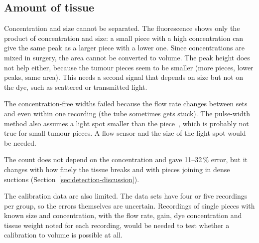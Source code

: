 \subsection{Amount of tissue}
\label{sec:amount-discussion}
Concentration and size cannot be separated. The fluorescence shows only the product of
concentration and size: a small piece with a high concentration can give the same peak as a larger piece
with a lower one. Since concentrations are mixed in surgery, the area cannot be converted to
volume. The peak height does not help either, because the tumour pieces seem to be smaller
(more pieces, lower peaks, same area). This needs a second signal that depends on size but not
on the dye, such as scattered or transmitted light.

The concentration-free widths failed because the flow
rate changes between sets and even within one recording (the tube sometimes gets stuck). The
pulse-width method also assumes a light spot smaller than the piece~\cite{sharpless1976},
which is probably not true for small tumour pieces. A flow sensor and the size of the light
spot would be needed.

The count does not depend on the
concentration and gave 11--32\,\% error, but it changes with how finely the tissue breaks and
with pieces joining in dense suctions (Section~\ref{sec:detection-discussion}).

The calibration data are also limited. The data sets have four or five recordings per group, so the errors
themselves are uncertain. Recordings of single pieces with known size and concentration, with the
flow rate, gain, dye concentration and tissue weight noted for each recording, would be needed
to test whether a calibration to volume is possible at all.
